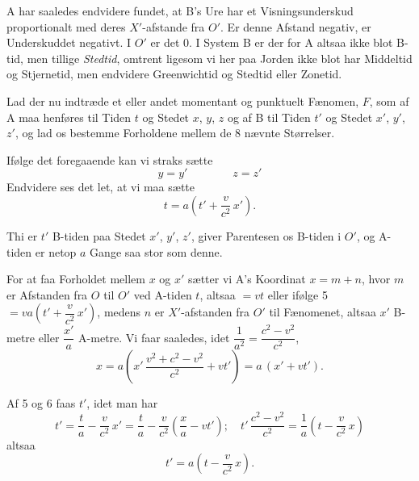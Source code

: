 \documentclass[12pt,a4paper]{article}
\newcommand{\opage}[1]{\marginnote{\footnotesize\textit{[#1]}}}
\begin{document}
A har saaledes endvidere fundet, at B's Ure har et Visningsunderskud
proportionalt med deres $X'$-afstande fra $O'$. Er denne Afstand negativ,
er Underskuddet negativt. I $O'$ er det 0. I System B er der for A altsaa
ikke blot B-tid, men tillige \emph{Stedtid}, omtrent ligesom vi her paa
Jorden ikke blot har Middeltid og Stjernetid, men endvidere Greenwichtid
og Stedtid eller Zonetid.

Lad der nu indtræde et eller andet momentant og punktuelt Fænomen, $F$,
som af A maa henføres til Tiden $t$ og Stedet $x$, $y$, $z$ og af B til
Tiden $t'$ og Stedet $x'$, $y'$, $z'$, og lad os bestemme Forholdene mellem
de 8 nævnte Størrelser.

Ifølge det foregaaende kan vi straks sætte
\begin{equation}\tag*{3.\quad 4.}
  y = y' \qquad\qquad z = z'
\end{equation}
Endvidere ses det let, at vi maa sætte
\begin{equation}\tag*{5.}
  t = a\left(t' + \frac{v}{c^{2}}\,x'\right).
\end{equation}

\opage{12} Thi er $t'$ B-tiden paa Stedet $x'$, $y'$, $z'$, giver Parentesen os
B-tiden i $O'$, og A-tiden er netop $a$ Gange saa stor som denne.

For at faa Forholdet mellem $x$ og $x'$ sætter vi A's Koordinat
$x = m + n$, hvor $m$ er Afstanden fra $O$ til $O'$ ved A-tiden $t$, altsaa
$= vt$ eller ifølge 5 $= va\left(t' + \dfrac{v}{c^{2}}\,x'\right)$, medens
$n$ er $X'$-afstanden fra $O'$ til Fænomenet, altsaa $x'$ B-metre eller
$\dfrac{x'}{a}$ A-metre. Vi faar saaledes, idet
$\dfrac{1}{a^{2}} = \dfrac{c^{2}-v^{2}}{c^{2}}$,
\begin{equation}\tag*{6.}
  x = a\left(x'\,\frac{v^{2}+c^{2}-v^{2}}{c^{2}} + vt'\right)
    = a\,(x' + vt').
\end{equation}

Af 5 og 6 faas $t'$, idet man har
\[
  t' = \frac{t}{a} - \frac{v}{c^{2}}\,x'
     = \frac{t}{a} - \frac{v}{c^{2}}\left(\frac{x}{a} - vt'\right);\quad
  t'\,\frac{c^{2}-v^{2}}{c^{2}}
     = \frac{1}{a}\left(t - \frac{v}{c^{2}}\,x\right)
\]
altsaa
\begin{equation}\tag*{7.}
  t' = a\left(t - \frac{v}{c^{2}}\,x\right).
\end{equation}
\end{document}
